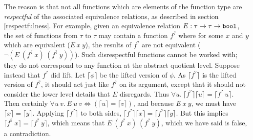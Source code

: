 \documentclass[envcountsame,runningheads]{llncs}
\begin{document}
The reason is that not all functions which are elements of the function
type are {\it respectful\/} of the associated equivalence relations,
as described in
section {\ref{respectfulness}}. 
For example, given an equivalence relation
$E:\tau \rightarrow \tau \rightarrow \mbox{\tt bool}$,
the set of functions from $\tau$ to $\tau$ may contain a function
$f^?$ where for some $x$ and $y$
which are equivalent
($E\ x\ y$), the results of $f^?$ are not equivalent
($\neg (E\ (f^?\ x)\ (f^?\ y))$).
Such disrespectful functions cannot be worked with; they do not 
correspond to any function at the abstract quotient level.
%
Suppose instead that $f^?$ did lift. 
Let $\lceil \phi \rceil$ be the lifted version of $\phi$. 
As $\lceil f^? \rceil$ is the lifted version of $f^?$,
it should act just like $f^?$ on its argument, 
except that it should not consider the lower level details
that $E$
disregards.
Thus
$
\forall u.\ 
\lceil f^? \rceil \lceil u \rceil =
\lceil f^?\ u \rceil $.
Then
certainly
$\forall u\ v.\ E\ u\ v \Leftrightarrow (\lceil u \rceil = \lceil v \rceil)$,
and
because $E\ x\ y$, we must have $\lceil x \rceil = \lceil y \rceil$.
Applying $\lceil f^? \rceil$ to both sides, 
$\lceil f^? \rceil \lceil x \rceil = \lceil f^? \rceil \lceil y \rceil$.
But this implies $\lceil f^?\ x \rceil = \lceil f^?\ y \rceil$,
which means that $E\ (f^?\ x)\ (f^?\ y)$, which we have said is false,
a contradiction.
%
\end{document}
